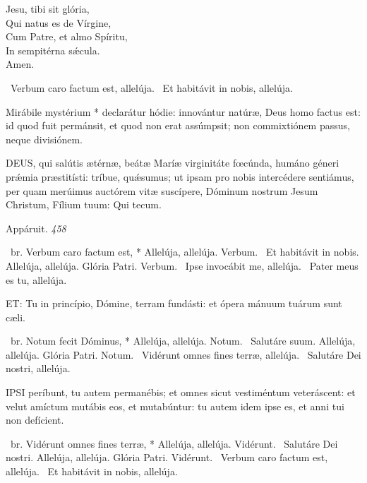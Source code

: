 Jesu, tibi sit glória,\\
Qui natus es de Vírgine,\\
Cum Patre, et almo Spíritu,\\
In sempitérna sǽcula.\\
Amen.

\V\ Verbum caro factum est, allelúja. \R\ Et habitávit in nobis, allelúja.

 Mirábile mystérium * declarátur hódie: innovántur natúræ, Deus homo factus est: id quod fuit permánsit, et quod non erat assúmpsit; non commixtiónem passus, neque divisiónem.


\lettrine[lines=2]{D}{EUS}, qui salútis ætérnæ, beátæ Maríæ virginitáte fœcúnda, humáno géneri prǽmia præstitísti: tríbue, quǽsumus; ut ipsam pro nobis intercédere sentiámus, per quam merúimus auctórem vitæ suscípere, Dóminum nostrum Jesum Christum, Fílium tuum: Qui tecum.



 Appáruit. \textit{458}

\R\ br. Verbum caro factum est, * Allelúja, allelúja. Verbum. \V\ Et habitávit in nobis. Allelúja, allelúja. Glória Patri. Verbum. \V\ Ipse invocábit me, allelúja. \R\ Pater meus es tu, allelúja.



\lettrine[lines=2]{E}{T}: Tu in princípio, Dómine, terram fundásti: et ópera mánuum tuárum sunt cæli.

\R\ br. Notum fecit Dóminus, * Allelúja, allelúja. Notum. \V\ Salutáre suum. Allelúja, allelúja. Glória Patri. Notum. \V\ Vidérunt omnes fines terræ, allelúja. \R\ Salutáre Dei nostri, allelúja.



\lettrine[lines=2]{I}{PSI} períbunt, tu autem permanébis; et omnes sicut vestiméntum veteráscent: et velut amíctum mutábis eos, et mutabúntur: tu autem idem ipse es, et anni tui non defícient.

\R\ br. Vidérunt omnes fines terræ, * Allelúja, allelúja. Vidérunt. \V\ Salutáre Dei nostri. Allelúja, allelúja. Glória Patri. Vidérunt. \V\ Verbum caro factum est, allelúja. \R\ Et habitávit in nobis, allelúja.

